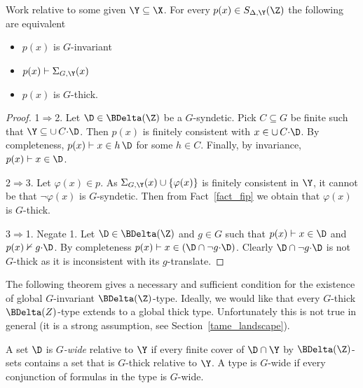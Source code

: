 \begin{theorem}\label{thm_syndetic_invariant}
  Work relative to some given $\Y\subseteq\X$.
  For every $p(x)\in S_{\Delta,\Y}(\Z)$ the following are equivalent
  \begin{itemize}
    \item[1.] $p(x)$ is $G$-invariant
    \item[2.] $p(x)\vdash\Sigma_{G,\Y}(x)$
    \item[3.] $p(x)$ is $G$-thick.
  \end{itemize}
\end{theorem}

\begin{proof}
  1$\Rightarrow$2.
  Let $\D\in\BDelta(\Z)$ be a $G$-syndetic.
  Pick $C\subseteq G$ be finite such that $\Y\subseteq\cup\,C{\cdot}\D$.
  Then $p(x)$ is finitely consistent with $x\in\cup\,C{\cdot}\D$.
  By completeness, $p(x)\vdash x\in h\,\D$ for some $h\in C$.
  Finally, by invariance, $p(x)\vdash x\in\D$.
  
  2$\Rightarrow$3.
  Let $\varphi(x)\in p$.
  As $\Sigma_{G,\Y}(x)\cup\{\varphi(x)\}$ is finitely consistent in $\Y$, it cannot be that $\neg\varphi(x)$ is $G$-syndetic.
  Then from Fact~\ref{fact_fip} we obtain that $\varphi(x)$ is $G$-thick.

  3$\Rightarrow$1.
  Negate 1.
  Let $\D\in\BDelta(\Z)$ and $g\in G$ such that $p(x)\vdash x\in\D$ and $p(x)\nvdash g{\cdot}\D$.
  By completeness $p(x)\vdash x\in(\D\cap\neg g{\cdot}\D)$.
  Clearly $\D\cap \neg g{\cdot}\D$ is not $G$-thick as it is inconsistent with its $g$-translate.
\end{proof}


The following theorem gives a necessary and sufficient condition for the  existence of global $G$-invariant $\BDelta(\Z)$-type.
Ideally, we would like that every $G$-thick $\BDelta(Z)$-type extends to a global thick type.
Unfortunately this is not true in general (it is a strong assumption, see Section~\ref{tame_landscape}).

A set $\D$ is \emph{$G$-wide\/} relative to $\Y$ if every finite cover of $\D\cap\Y$ by $\BDelta(\Z)$-sets contains a set that is $G$-thick relative to $\Y$.
A type is $G$-wide if every conjunction of formulas in the type is $G$-wide.

